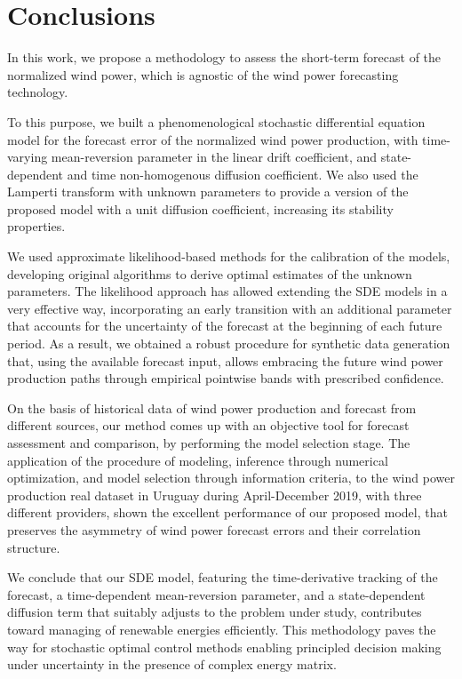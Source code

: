 \documentclass[11pt]{article}
\theoremstyle{definition}
\begin{document}


\section{Conclusions} \label{Section_7}

In this work, we propose a methodology to assess the short-term forecast of the normalized wind power, which is agnostic of the wind power forecasting technology. 

To this purpose, we built a phenomenological stochastic differential equation model for the forecast error of the normalized wind power production, with time-varying mean-reversion parameter in the linear drift coefficient, and state-dependent and time non-homogenous diffusion coefficient. We also used the Lamperti transform with unknown parameters to provide a version of the proposed model with a unit diffusion coefficient, increasing its stability properties.

We used approximate likelihood-based methods for the calibration of the models, developing original algorithms to derive optimal estimates of the unknown parameters.
The likelihood approach has allowed extending the SDE models in a very effective way, incorporating an early transition with an additional parameter that accounts for the uncertainty of the forecast at the beginning of each future period. As a result, we obtained a robust procedure for synthetic data generation that, using the available forecast input, allows embracing the future wind power production paths through empirical pointwise bands with prescribed confidence. 

On the basis of historical data of wind power production and forecast from different sources, our method comes up with an objective tool for forecast assessment and comparison, by performing the model selection stage.
The application of the procedure of modeling, inference through numerical optimization, and model selection through information criteria, to the wind power production real dataset in Uruguay during April-December 2019, with three different providers, shown the excellent performance of our proposed model, that preserves the asymmetry of wind power forecast errors and their correlation structure.
 
 We conclude that our SDE model, featuring the time-derivative tracking of the forecast, a time-dependent mean-reversion parameter, and a state-dependent diffusion term that suitably adjusts to the problem under study, contributes toward managing of renewable energies efficiently. This methodology paves the way for stochastic optimal control methods enabling principled decision making under uncertainty in the presence of complex energy matrix.
\end{document}
